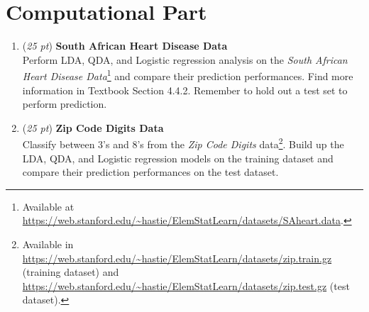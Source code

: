 \documentclass[10pt]{article}
\theoremstyle{definition}
\theoremstyle{remark}
\begin{document}
\section*{Computational Part}

\begin{enumerate}
	\item (\textit{25 pt}) \textbf{South African Heart Disease Data} \\
	Perform LDA, QDA, and Logistic regression analysis on the \textit{South African Heart Disease Data}\footnote{Available at  \url{https://web.stanford.edu/~hastie/ElemStatLearn/datasets/SAheart.data}.} and compare their prediction performances. Find more information in Textbook Section 4.4.2. Remember to hold out a test set to perform prediction.
	
	\item (\textit{25 pt}) \textbf{Zip Code Digits Data} \\
	Classify between 3's and 8's from the \textit{Zip Code Digits} data\footnote{Available in \url{https://web.stanford.edu/~hastie/ElemStatLearn/datasets/zip.train.gz} (training dataset) and \url{https://web.stanford.edu/~hastie/ElemStatLearn/datasets/zip.test.gz} (test dataset).}. Build up the LDA, QDA, and Logistic regression models on the training dataset and compare their prediction performances on the test dataset.
\end{enumerate}



\end{document}
